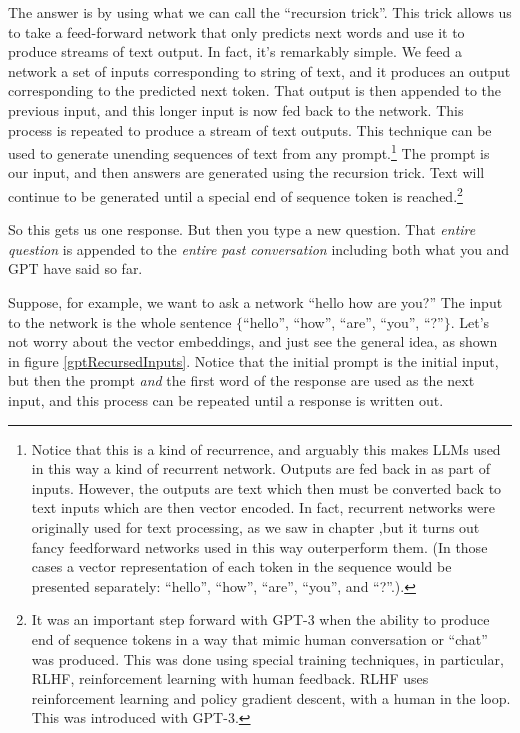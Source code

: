 The answer is by using what we can call the ``recursion trick''. This trick allows us to take a feed-forward network that only predicts next words and use it to produce streams of text output. In fact, it's remarkably simple. We feed a network a set of inputs corresponding to string of text, and it produces an output corresponding to the predicted next token. That output is then appended to the previous input, and this longer input is now fed back to the network. This process is repeated to produce a stream of text outputs. This technique can be used to generate unending sequences of text from any prompt.\footnote{Notice that this is a kind of recurrence, and arguably this makes LLMs used in this way a kind of recurrent network. Outputs are fed back in as part of inputs. However, the outputs are text which then must be converted back to text inputs which are then vector encoded. In fact, recurrent networks were originally used for text processing, as we saw in chapter ,but it turns out fancy feedforward networks used in this way outerperform them. (In those cases a vector representation of each token in the sequence would be presented separately: ``hello'', ``how'', ``are'', ``you'', and ``?''.).} The prompt is our input, and then answers are generated using the recursion trick. Text will continue to be generated until a special end of sequence token is reached.\footnote{It was an important step forward with GPT-3 when the ability to produce end of sequence tokens in a way that mimic human conversation or ``chat'' was produced. This was done using special training techniques, in particular, RLHF, reinforcement learning with human feedback. RLHF uses reinforcement learning and policy gradient descent, with a human in the loop. This was introduced with GPT-3.} 

So this gets us one response. But then you type a new question. That \emph{entire question} is appended to the \emph{entire past conversation} including both what you and GPT have said so far. 

Suppose, for example, we want to ask a network ``hello how are you?'' The input to the network is the whole sentence $\{$``hello'', ``how'', ``are'', ``you'', ``?''$\}$. Let's  not worry about the vector embeddings, and just see the general idea, as shown in figure \ref{gptRecursedInputs}. Notice that the initial prompt is the initial input, but then the prompt \emph{and} the first word of the response are used as the next input, and this process can be repeated until a response is written out.
  
